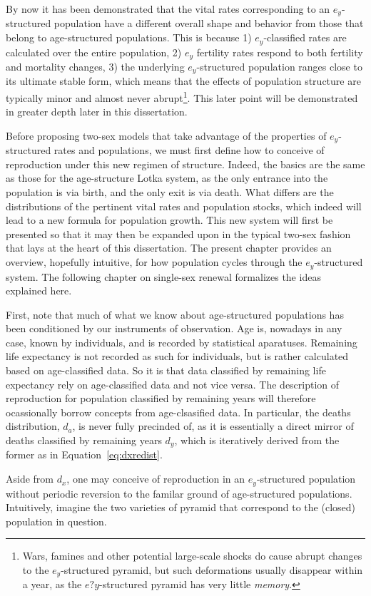  \FloatBarrier
\label{sec:exstructuredrenewal}
By now it has been demonstrated that the vital rates corresponding to an
$e_y$-structured population have a different overall shape and behavior from
those that belong to age-structured populations. This is because 1) $e_y$-classified rates
are calculated over the entire population, 2) $e_y$ fertility rates respond to
both fertility and mortality changes, 3) the underlying $e_y$-structured
population ranges close to its ultimate stable form, which means that
the effects of population structure are typically minor and almost never
abrupt\footnote{Wars, famines and other potential large-scale shocks do cause
abrupt changes to the $e_y$-structured pyramid, but such deformations usually
disappear within a year, as the  $e?y$-structured pyramid has very little
\textit{memory}.}. This later point will be demonstrated in greater depth later
in this dissertation.

Before proposing two-sex models that take advantage of the properties of
$e_y$-structured rates and populations, we must first define how to conceive of
reproduction under this new regimen of structure. Indeed, the basics are the
same as those for the age-structure Lotka system, as the only entrance into the
population is via birth, and the only exit is via death. What differs are the
distributions of the pertinent vital rates and population stocks, which indeed
will lead to a new formula for population growth. This new system will first be
presented so that it may then be expanded upon in the typical two-sex fashion
that lays at the heart of this dissertation. The present chapter provides an
overview, hopefully intuitive, for how population cycles through the
$e_y$-structured system. The following chapter on single-sex renewal formalizes
the ideas explained here.

First, note that much of what we know about age-structured populations has been
conditioned by our instruments of observation. Age is, nowadays in any case,
known by individuals, and is recorded by statistical aparatuses. Remaining life
expectancy is not recorded as such for individuals, but is rather calculated
based on age-classified data. So it is that data classified by remaining
life expectancy rely on age-classified data and not vice versa. The description of 
reproduction for population classified by remaining years will therefore
ocassionally borrow concepts from age-clsasified data. In particular, the deaths
distribution, $d_a$, is never fully precinded of, as it is essentially a direct
mirror of deaths classified by remaining years $d_y$, which is
iteratively derived from the former as in Equation~\eqref{eq:dxredist}.

Aside from $d_x$, one may conceive of reproduction in an $e_y$-structured
population without periodic reversion to the familar ground of age-structured populations.
Intuitively, imagine the two varieties of pyramid that correspond to the
(closed) population in question. 